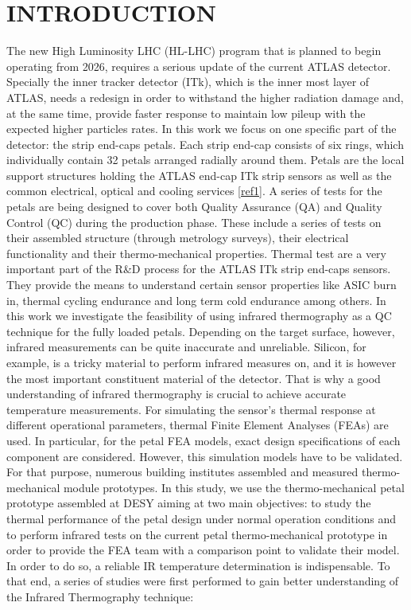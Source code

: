 \pagestyle{introduction}

\section*{\uppercase{Introduction}}\label{intro}
	\bigskip
	\bigskip
	The new High Luminosity LHC (HL-LHC) program that is planned to begin operating from 2026, requires a serious update of the current ATLAS detector. Specially the inner tracker detector (ITk), which is the inner most layer of ATLAS, needs a redesign in order to withstand the higher radiation damage and, at the same time, provide faster response to maintain low pileup with the expected higher particles rates.
	In this work we focus on one specific part of the detector: the strip end-caps petals. Each strip end-cap consists of six rings, which individually contain 32 petals arranged radially around them. Petals are the local support structures holding the ATLAS end-cap ITk strip sensors as well as the common electrical, optical and cooling services \ref{ref1}. A series of tests for the petals are being designed to cover both Quality Assurance (QA) and Quality Control (QC) during the production phase. These include a series of tests on their assembled structure (through metrology surveys), their electrical functionality and their thermo-mechanical properties.
	Thermal test are a very important part of the R\&D process for the ATLAS ITk strip end-caps sensors. They provide the means to understand certain sensor properties like ASIC burn in, thermal cycling endurance and long term cold endurance among others.
	In this work we investigate the feasibility of using infrared thermography as a QC technique for the fully loaded petals. Depending on the target surface, however, infrared measurements can be quite inaccurate and unreliable. Silicon, for example, is a tricky material to perform infrared measures on, and it is however the most important constituent material of the detector. That is why a good understanding of infrared thermography is crucial to achieve accurate temperature measurements.
	For simulating the sensor's thermal response at different operational parameters, thermal Finite Element Analyses (FEAs) are used. In particular, for the petal FEA models, exact design specifications of each component are considered. However, this simulation models have to be validated. For that purpose, numerous building institutes assembled and measured thermo-mechanical module prototypes.
	In this study, we use the thermo-mechanical petal prototype assembled at DESY aiming at two main objectives: to study the thermal performance of the petal design under	normal operation conditions and to perform infrared tests on the current petal thermo-mechanical prototype in order to provide the FEA team with a comparison point to validate their model. In order to do so, a reliable IR temperature determination is indispensable. To that end, a series of studies were first performed to gain better understanding of the Infrared Thermography technique:
		
